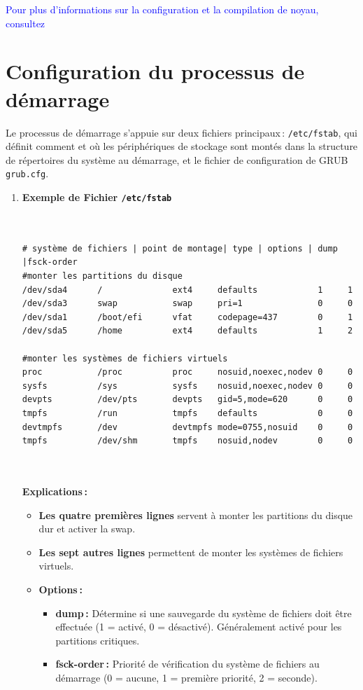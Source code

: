 \textcolor{blue}{Pour plus d’informations sur la configuration et la compilation de noyau, consultez \cite{linuxkernel}}
\section{Configuration du processus de démarrage}
\label{sssec:boot}

Le processus de démarrage s’appuie sur deux fichiers principaux : \texttt{/etc/fstab}, qui définit comment et où les périphériques de stockage  sont montés dans la structure de répertoires du système au démarrage, et le fichier de configuration de GRUB \texttt{grub.cfg}.


\begin{enumerate}

  \item \textbf{Exemple de Fichier \texttt{/etc/fstab}}  
  
  \begin{verbatim}


# système de fichiers | point de montage| type | options | dump |fsck-order
#monter les partitions du disque
/dev/sda4      /              ext4     defaults            1     1
/dev/sda3      swap           swap     pri=1               0     0
/dev/sda1      /boot/efi      vfat     codepage=437        0     1
/dev/sda5      /home          ext4     defaults            1     2

#monter les systèmes de fichiers virtuels
proc           /proc          proc     nosuid,noexec,nodev 0     0
sysfs          /sys           sysfs    nosuid,noexec,nodev 0     0
devpts         /dev/pts       devpts   gid=5,mode=620      0     0
tmpfs          /run           tmpfs    defaults            0     0
devtmpfs       /dev           devtmpfs mode=0755,nosuid    0     0
tmpfs          /dev/shm       tmpfs    nosuid,nodev        0     0



  \end{verbatim}
 \textbf{Explications :}
  \begin{itemize}
    \item \textbf{Les quatre premières lignes} servent à monter les partitions du disque dur et activer la swap.
    \item \textbf{Les sept autres lignes} permettent de monter les systèmes de fichiers virtuels.
    \item \textbf{Options :}
    \begin{itemize}
      \item \textbf{dump :} Détermine si une sauvegarde du système de fichiers doit être effectuée (1 = activé, 0 = désactivé). Généralement activé pour les partitions critiques.
      \item \textbf{fsck-order :} Priorité de vérification du système de fichiers au démarrage (0 = aucune, 1 = première priorité, 2 = seconde).\\
    \end{itemize}
  \end{itemize}



\end{enumerate}
